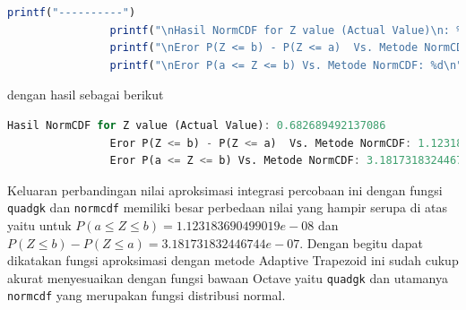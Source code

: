 \documentclass[journal,12pt,onecolumn,a4paper]{IEEEtran}
\begin{document}
\begin{enumerate}
\begin{lstlisting}[language=Octave]
				printf("----------")
				printf("\nHasil NormCDF for Z value (Actual Value)\n: %d", cdf_ans)
				printf("\nEror P(Z <= b) - P(Z <= a)  Vs. Metode NormCDF: %d\n", err_cdf)
				printf("\nEror P(a <= Z <= b) Vs. Metode NormCDF: %d\n", err_cdf_ab)
			\end{lstlisting}

	      dengan hasil sebagai berikut

	      \begin{lstlisting}[language=Octave]
				Hasil NormCDF for Z value (Actual Value): 0.682689492137086
				Eror P(Z <= b) - P(Z <= a)  Vs. Metode NormCDF: 1.123183690499019e-08
				Eror P(a <= Z <= b) Vs. Metode NormCDF: 3.181731832446744e-07
			\end{lstlisting}

	      Keluaran perbandingan nilai aproksimasi integrasi percobaan ini dengan fungsi \lstinline{quadgk} dan \lstinline{normcdf} memiliki besar perbedaan nilai
	      yang hampir serupa di atas yaitu untuk \(P(a \le Z \le b)= 1.123183690499019e-08\)  dan \(P(Z \le b ) - P(Z \le a ) = 3.181731832446744e-07\).
	      Dengan begitu dapat dikatakan fungsi aproksimasi dengan metode
	      Adaptive Trapezoid ini sudah cukup akurat menyesuaikan dengan fungsi bawaan Octave yaitu \lstinline{quadgk} dan utamanya \lstinline{normcdf} yang merupakan fungsi distribusi normal.


\end{enumerate}
\end{document}
